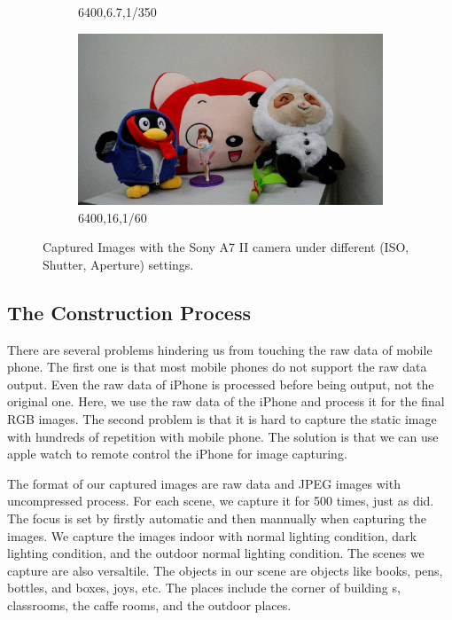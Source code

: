\begin{figure}
\begin{subfigure}[t]{0.32\textwidth}
		\caption{6400,6.7,1/350}
    \end{subfigure}
    \hfill
    \begin{subfigure}[t]{0.32\textwidth}
        \centering
        \includegraphics[width=1\textwidth]{images/dataset/6400_16_1-60.jpg}
		\caption{6400,16,1/60}
    \end{subfigure}
    \caption{Captured Images with the Sony A7 II camera under different (ISO, Shutter, Aperture) settings.}
    \label{fig6-1}
\end{figure}


\subsection{The Construction Process}

There are several problems hindering us from touching the raw data of mobile phone. The first one is that most mobile phones do not support the raw data output. Even the raw data of  iPhone is processed before being output, not the original one. Here, we use the raw data of the iPhone and process it for the final RGB images. The second problem is that it is hard to capture the static image with hundreds of repetition with mobile phone. The solution is that we can use apple watch to remote control the iPhone for image capturing. 

The format of our captured images are raw data and JPEG images with uncompressed process. For each scene, we capture it for 500 times, just as \cite{crosschannel2016} did. The focus is set by firstly automatic and then mannually when capturing the images. We capture the images indoor with normal lighting condition, dark lighting condition, and the outdoor normal lighting condition. The scenes we capture are also versaltile. The objects in our scene are objects like books, pens, bottles, and boxes, joys, etc. The places include the corner of building s, classrooms, the caffe rooms, and the outdoor places.

